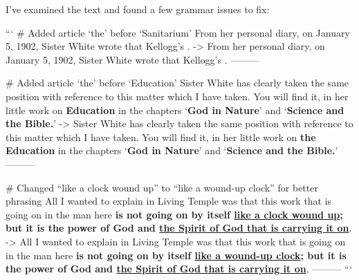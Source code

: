 I've examined the text and found a few grammar issues to fix:

```
# Added article ‘the’ before ‘Sanitarium’
From her personal diary, on January 5, 1902, Sister White wrote that Kellogg's .
->
From her personal diary, on January 5, 1902, Sister White wrote that Kellogg's .
---------

# Added article ‘the’ before ‘Education’
Sister White has clearly taken the same position with reference to this matter which I have taken. You will find it, in her little work on \textbf{Education }in the chapters ‘\textbf{God in Nature}’ and ‘\textbf{Science and the Bible.}’
->
Sister White has clearly taken the same position with reference to this matter which I have taken. You will find it, in her little work on \textbf{the Education }in the chapters ‘\textbf{God in Nature}’ and ‘\textbf{Science and the Bible.}’
---------

# Changed “like a clock wound up” to “like a wound-up clock” for better phrasing
All I wanted to explain in Living Temple was that this work that is going on in the man here \textbf{is not going on by itself \underline{like a clock wound up}; but it is the power of God and \underline{the Spirit of God that is carrying it on}}.
->
All I wanted to explain in Living Temple was that this work that is going on in the man here \textbf{is not going on by itself \underline{like a wound-up clock}; but it is the power of God and \underline{the Spirit of God that is carrying it on}}.
---------
```